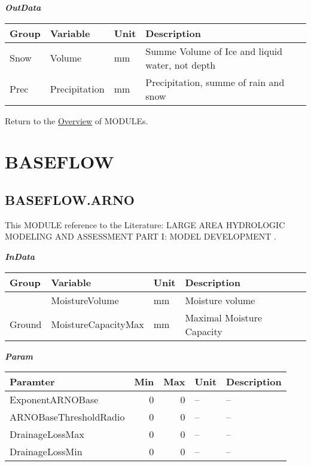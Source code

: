 \documentclass[
]{book}
\begin{document}
\textbf{\emph{OutData}}

\begin{table}[!h]
\centering
\begin{tabular}{l|l|l|l}
\hline
Group & Variable & Unit & Description\\
\hline
Snow & Volume & mm & Summe Volume of Ice and liquid water, not depth\\
\cline{1-4}
Prec & Precipitation & mm & Precipitation, summe of rain and snow\\
\hline
\end{tabular}
\end{table}

Return to the \protect\hyperlink{module}{Overview} of MODULEs.

\hypertarget{BASEFLOW}{%
\section{BASEFLOW}\label{BASEFLOW}}

\hypertarget{BASEFLOW.ARNO}{%
\subsection{BASEFLOW.ARNO}\label{BASEFLOW.ARNO}}

This MODULE reference to the Literature: LARGE AREA HYDROLOGIC MODELING AND ASSESSMENT PART I: MODEL DEVELOPMENT \citep{Arnold.1998}.

\textbf{\emph{InData}}

\begin{table}[!h]
\centering
\begin{tabular}{l|l|l|l}
\hline
Group & Variable & Unit & Description\\
\hline
 & MoistureVolume & mm & Moisture volume\\
\cline{2-4}
\multirow{-2}{*}{\raggedright\arraybackslash Ground} & MoistureCapacityMax & mm & Maximal Moisture Capacity\\
\hline
\end{tabular}
\end{table}

\textbf{\emph{Param}}

\begin{table}[!h]
\centering
\begin{tabular}{l|r|r|l|l}
\hline
Paramter & Min & Max & Unit & Description\\
\hline
ExponentARNOBase & 0 & 0 & -- & --\\
\cline{1-5}
ARNOBaseThresholdRadio & 0 & 0 & -- & --\\
\cline{1-5}
DrainageLossMax & 0 & 0 & -- & --\\
\cline{1-5}
DrainageLossMin & 0 & 0 & -- & --\\
\hline
\end{tabular}
\end{table}
\end{document}
